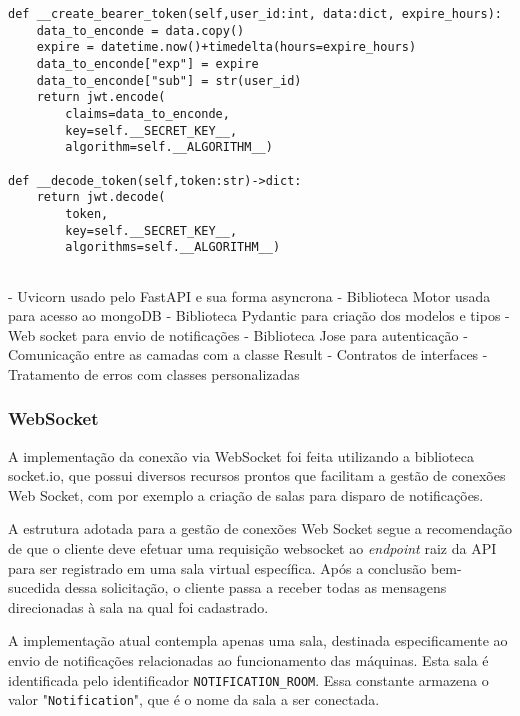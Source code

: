 \begin{verbatim}
def __create_bearer_token(self,user_id:int, data:dict, expire_hours):
    data_to_enconde = data.copy()
    expire = datetime.now()+timedelta(hours=expire_hours)
    data_to_enconde["exp"] = expire
    data_to_enconde["sub"] = str(user_id)
    return jwt.encode(
        claims=data_to_enconde,
        key=self.__SECRET_KEY__,
        algorithm=self.__ALGORITHM__)

def __decode_token(self,token:str)->dict:
    return jwt.decode(
        token,
        key=self.__SECRET_KEY__,
        algorithms=self.__ALGORITHM__)
    
\end{verbatim}






- Uvicorn usado pelo FastAPI e sua forma asyncrona
- Biblioteca Motor usada para acesso ao mongoDB
- Biblioteca Pydantic para criação dos modelos e tipos
- Web socket para envio de notificações
- Biblioteca Jose para autenticação
- Comunicação entre as camadas com a classe Result
- Contratos de interfaces
- Tratamento de erros com classes personalizadas

\subsubsection{WebSocket}\label{subsubsec:WebSocketImplement}
A implementação da conexão via WebSocket foi feita utilizando a biblioteca socket.io, que possui diversos recursos prontos que facilitam a gestão de conexões Web Socket, com por exemplo a criação de salas para disparo de notificações.

A estrutura adotada para a gestão de conexões Web Socket segue a recomendação de que o cliente deve efetuar uma requisição websocket ao \textit{endpoint} raiz da API para ser registrado em uma sala virtual específica. Após a conclusão bem-sucedida dessa solicitação, o cliente passa a receber todas as mensagens direcionadas à sala na qual foi cadastrado.

A implementação atual contempla apenas uma sala, destinada especificamente ao envio de notificações relacionadas ao funcionamento das máquinas. Esta sala é identificada pelo identificador \texttt{NOTIFICATION\_ROOM}. Essa constante armazena o valor "\texttt{Notification}", que é o nome da sala a ser conectada.

